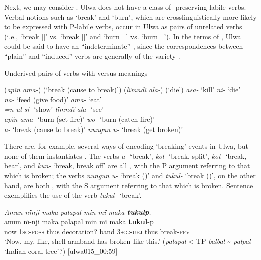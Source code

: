   Next, we may consider . Ulwa does not have a class of -\linebreak preserving  labile verbs. Verbal notions such as ‘break’ and ‘burn’, which are crosslinguistically more likely to be expressed with P-labile verbs, occur in Ulwa as pairs of unrelated verbs (i.e., ‘break []’ vs. ‘break []’ and ‘burn []’ vs. ‘burn []’). In the terms of \citet{NicholsEtAl2004}, Ulwa could be said to have an  “indeterminate” , since the correspondences between “plain” and “induced” verbs are generally of the  variety .

  
  \ea%
    \label{ex:syntax:295a}
    Underived pairs of verbs with  versus  meanings\\
    \begin{tabbing}
{(\textit{apïn ama-})} \= {(‘break (cause to break)’)} \= {(\textit{lïmndï ala-})} \= {(‘die’)}\kill
\textit{asa-} \> ‘kill’ \> \textit{ni-} \> ‘die’\\
\textit{na-} \> ‘feed (give food)’ \> \textit{ama-} \> ‘eat’\\
\textit{=n ul si-} \> ‘show’ \> \textit{lïmndï ala-} \> ‘see’\\
\textit{apïn ama-} \> ‘burn (set fire)’ \> \textit{wo-} \> ‘burn (catch fire)’\\
\textit{a-} \> ‘break (cause to break)’ \> \textit{nungun u-} \> ‘break (get broken)’
    \end{tabbing}
\z

  There are, for example, several ways of encoding ‘breaking’ events in Ulwa, but none of them instantiates . The verbs \textit{a-} ‘break’, \textit{kol-} ‘break, split’, \textit{kot-} ‘break, bear’, and \textit{kun-} ‘break, break off’ are all , with the P argument referring to that which is broken; the verbs \textit{nungun u-} ‘break ()’ and \textit{tukul-} ‘break ()’, on the other hand, are both , with the S argument referring to that which is broken. Sentence  exemplifies the use of the  verb \textit{tukul-} ‘break’.

\ea%
    \label{ex:syntax:296}
          \textit{Amun nïnji maka palapal min mï maka \textbf{tukulp}.}\\
\gll    amun  nï-nji    maka  palapal      min  mï    maka     \textbf{tukul}-p\\
    now  1\textsc{sg-poss}  thus  decoration?  band  3\textsc{sg.subj}  thus    break-\textsc{pfv}\\
\glt `Now, my, like, shell armband has broken like this.’ (\textit{palapal} < TP \textit{balbal} {\textasciitilde} \textit{palpal} ‘Indian coral tree’?) [ulwa015\_00:59]
\z

